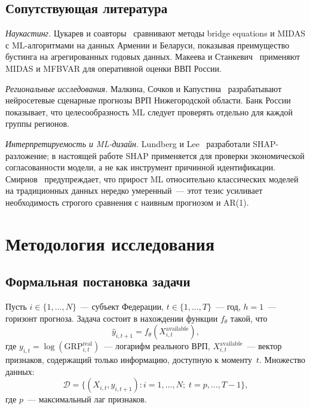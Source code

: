\documentclass[12pt,a4paper]{article}
\begin{document}
\subsection{Сопутствующая литература}

\textit{Наукастинг.} Цукарев и соавторы~\cite{tsukarev2025} сравнивают
методы bridge equations и MIDAS с ML-алгоритмами на данных Армении
и Беларуси, показывая преимущество бустинга на агрегированных годовых данных.
Макеева и Станкевич~\cite{makeeva2022} применяют MIDAS и MFBVAR для
оперативной оценки ВВП России.

\textit{Региональные исследования.} Малкина, Сочков и Капустина~\cite{malkina2025}
разрабатывают нейросетевые сценарные прогнозы ВРП Нижегородской области.
Банк России~\cite{semiturkin2022} показывает, что целесообразность ML
следует проверять отдельно для каждой группы регионов.

\textit{Интерпретируемость и ML-дизайн.} Lundberg и Lee~\cite{lundberg2017}
разработали SHAP-разложение; в настоящей работе SHAP применяется для
проверки экономической согласованности модели, а не как инструмент
причинной идентификации. Смирнов~\cite{smirnov2025} предупреждает, что
прирост ML относительно классических моделей на традиционных данных
нередко умеренный~--- этот тезис усиливает необходимость строгого сравнения
с наивным прогнозом и AR(1).

\section{Методология исследования}

\subsection{Формальная постановка задачи}

Пусть $i \in \{1,\ldots,N\}$~--- субъект Федерации, $t \in \{1,\ldots,T\}$~---
год, $h=1$~--- горизонт прогноза. Задача состоит в нахождении функции
$f_\theta$ такой, что
\begin{equation}
  \hat{y}_{i,t+1} = f_\theta(X^{\text{available}}_{i,t}),
\end{equation}
где $y_{i,t} = \log(\mathrm{GRP}^{\text{real}}_{i,t})$~--- логарифм реального
ВРП, $X^{\text{available}}_{i,t}$~--- вектор признаков, содержащий только
информацию, доступную к моменту~$t$. Множество данных:
\begin{equation}
  \mathcal{D} = \{(X_{i,t}, y_{i,t+1}) : i = 1,\ldots,N;\; t = p,\ldots,T-1\},
\end{equation}
где $p$~--- максимальный лаг признаков.
\end{document}
